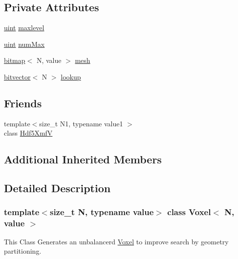 \subsection*{Private Attributes}
\begin{DoxyCompactItemize}
\item 
\mbox{\hyperlink{definitions_8h_a69aa29b598b851b0640aa225a9e5d61d}{uint}} \mbox{\hyperlink{classVoxel_addc02aaaef2f93ffcae1ded7a2184518}{maxlevel}}
\item 
\mbox{\hyperlink{definitions_8h_a69aa29b598b851b0640aa225a9e5d61d}{uint}} \mbox{\hyperlink{classVoxel_addfa7b07b7173c6727fd8cf0c38c61d8}{num\+Max}}
\item 
\mbox{\hyperlink{definitions_8h_acf2396ef4de9eb8a6324b9f1a624ea85}{bitmap}}$<$ N, value $>$ \mbox{\hyperlink{classVoxel_a3d53e01604350cc00c9bef098c7e23e5}{mesh}}
\item 
\mbox{\hyperlink{definitions_8h_a55821d7929f3f16aaf1466129c209492}{bitvector}}$<$ N $>$ \mbox{\hyperlink{classVoxel_a4e8a1661e9468250e10aa861d61f861e}{lookup}}
\end{DoxyCompactItemize}
\subsection*{Friends}
\begin{DoxyCompactItemize}
\item 
{\footnotesize template$<$size\+\_\+t N1, typename value1 $>$ }\\class \mbox{\hyperlink{classVoxel_a7f84a23096bb6840efa341b4cde72d9d}{Hdf5\+XmfV}}
\end{DoxyCompactItemize}
\subsection*{Additional Inherited Members}


\subsection{Detailed Description}
\subsubsection*{template$<$size\+\_\+t N, typename value$>$\newline
class Voxel$<$ N, value $>$}

This Class Generates an unbalancerd \mbox{\hyperlink{classVoxel}{Voxel}} to improve search by geometry partitioning. 

